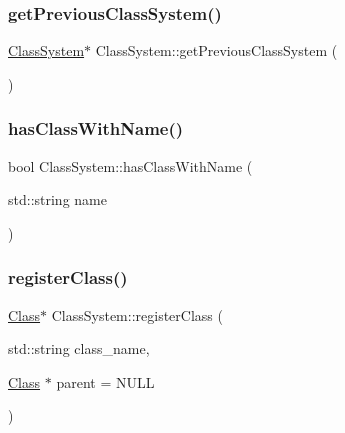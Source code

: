 \mbox{\label{classClassSystem_a32c4883e03da6a11ab11f2f39afc073a}} 
\subsubsection{\texorpdfstring{get\+Previous\+Class\+System()}{getPreviousClassSystem()}}
{\footnotesize\ttfamily \hyperlink{classClassSystem}{Class\+System}$\ast$ Class\+System\+::get\+Previous\+Class\+System (\begin{DoxyParamCaption}{ }\end{DoxyParamCaption})}

\mbox{\label{classClassSystem_aa3e6fdac5739091d3f48dbe2b8c9db46}} 
\subsubsection{\texorpdfstring{has\+Class\+With\+Name()}{hasClassWithName()}}
{\footnotesize\ttfamily bool Class\+System\+::has\+Class\+With\+Name (\begin{DoxyParamCaption}\item[{std\+::string}]{name }\end{DoxyParamCaption})}

\mbox{\label{classClassSystem_a02f4790dd9b8fa8808a4e17f1e152281}} 
\subsubsection{\texorpdfstring{register\+Class()}{registerClass()}}
{\footnotesize\ttfamily \hyperlink{classClass}{Class}$\ast$ Class\+System\+::register\+Class (\begin{DoxyParamCaption}\item[{std\+::string}]{class\+\_\+name,  }\item[{\hyperlink{classClass}{Class} $\ast$}]{parent = {\ttfamily NULL} }\end{DoxyParamCaption})}

